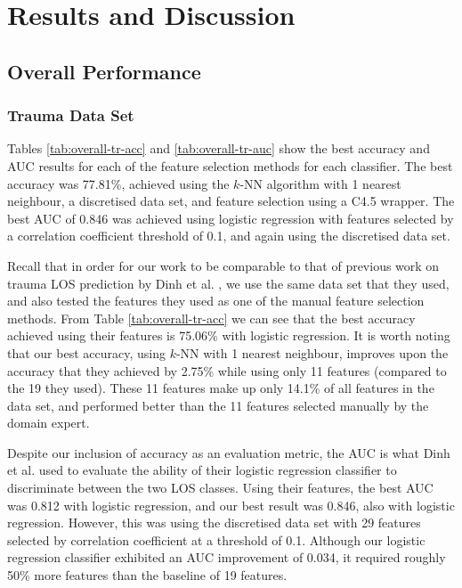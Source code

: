 \chapter{Results and Discussion} \label{chap:results}

\section{Overall Performance}
\subsection{Trauma Data Set}
Tables \ref{tab:overall-tr-acc} and \ref{tab:overall-tr-auc} show the best
accuracy and AUC results for each of the feature selection methods for each
classifier. The best accuracy was 77.81\%, achieved using the $k$-NN algorithm
with 1 nearest neighbour, a discretised data set, and feature selection using a
C4.5 wrapper. The best AUC of 0.846 was achieved using logistic regression with
features selected by a correlation coefficient threshold of 0.1, and again
using the discretised data set.




Recall that in order for our work to be comparable to that of previous work on
trauma LOS prediction by Dinh et al. \cite{Dinh2013a}, we use the same data set
that they used, and also tested the features they used as one of the manual
feature selection methods. From Table \ref{tab:overall-tr-acc} we can see that
the best accuracy achieved using their features is 75.06\% with logistic
regression. It is worth noting that our best accuracy, using $k$-NN with 1
nearest neighbour, improves upon the accuracy that they achieved by 2.75\%
while using only 11 features (compared to the 19 they used). These 11 features
make up only 14.1\% of all features in the data set, and performed better than
the 11 features selected manually by the domain expert.

Despite our inclusion of accuracy as an evaluation metric, the AUC is what Dinh
et al. used to evaluate the ability of their logistic regression classifier to
discriminate between the two LOS classes. Using their features, the best AUC
was 0.812 with logistic regression, and our best result was 0.846, also with
logistic regression. However, this was using the discretised data set with 29
features selected by correlation coefficient at a threshold of 0.1.
Although our logistic regression classifier exhibited an AUC improvement of
0.034, it required roughly 50\% more features than the baseline of 19 features.


